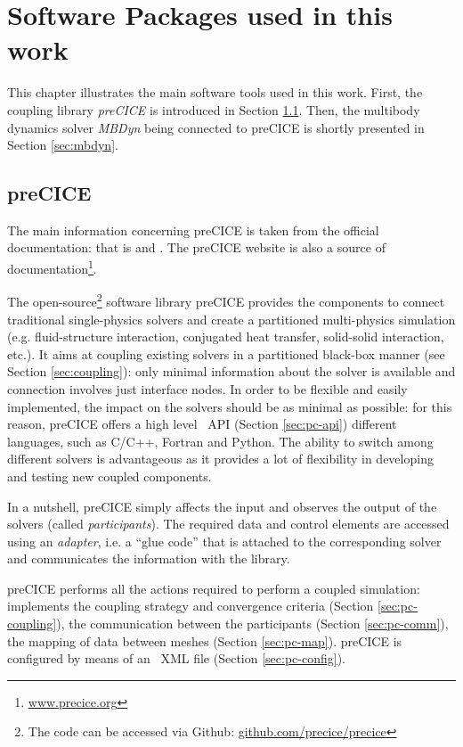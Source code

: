 \chapter{Software Packages used in this work}
\label{cha:software}

This chapter illustrates the main software tools used in this work. First, the coupling library \textit{preCICE} is introduced in Section \ref{sec:precice}. Then, the multibody dynamics solver \textit{MBDyn} being connected to preCICE is shortly presented in Section \ref{sec:mbdyn}.


\section{preCICE}
\label{sec:precice}

The main information concerning preCICE is taken from the official documentation: that is \cite{gatzhammer2014efficient} and  \cite{bungartz2016precice}. The preCICE website is also a source of documentation\footnote{\href{http://www.precice.org}{www.precice.org}}.

The open-source\footnote{The code can be accessed via Github: \href{https://github.com/precice/precice}{github.com/precice/precice}} software library preCICE provides the components to connect traditional single-physics solvers and create a partitioned multi-physics simulation (e.g. fluid-structure interaction, conjugated heat transfer, solid-solid interaction, etc.).
It aims at coupling existing solvers in a partitioned black-box manner (see Section \ref{sec:coupling}):  only minimal information about the solver is available and connection involves just interface nodes. 
In order to be flexible and easily implemented, the impact on the solvers should be as minimal as possible: for this reason, preCICE offers a high level ~\ac{API} (Section \ref{sec:pc-api}) different languages, such as C/C++, Fortran and Python.
The ability to switch among different solvers is advantageous as it provides a lot of flexibility in developing and testing new coupled components.

In a nutshell, preCICE simply affects the input and observes the output of the solvers (called \textit{participants}). The required data and control elements are accessed using an \textit{adapter}, i.e. a  ``glue code'' that is attached to the corresponding solver and communicates the information with the library.

preCICE performs all the actions required to perform a coupled simulation: implements the coupling strategy and convergence criteria (Section \ref{sec:pc-coupling}), the communication
between the participants (Section \ref{sec:pc-comm}), the mapping of data between meshes (Section \ref{sec:pc-map}). preCICE is configured by means of an ~\ac{XML} file (Section \ref{sec:pc-config}).



